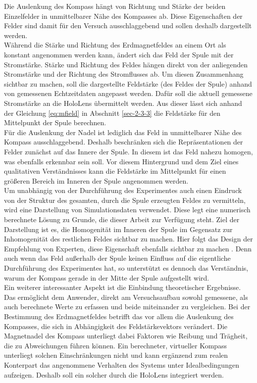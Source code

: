 Die Auslenkung des Kompass hängt von Richtung und Stärke der beiden Einzelfelder in unmittelbarer Nähe des Kompasses ab. Diese Eigenschaften der Felder sind damit für den Versuch ausschlaggebend und sollen deshalb dargestellt werden.\\
\noindent\hspace*{5mm}
Während die Stärke und Richtung des Erdmagnetfeldes an einem Ort als konstant angenommen werden kann, ändert sich das Feld der Spule mit der Stromstärke. Stärke und Richtung des Feldes hängen direkt von der anliegenden Stromstärke und der Richtung des Stromflusses ab. Um diesen Zusammenhang sichtbar zu machen, soll die dargestellte Feldstärke (des Feldes der Spule) anhand von gemessenen Echtzeitdaten angepasst werden. Dafür soll die aktuell gemessene Stromstärke an die HoloLens übermittelt werden. Aus dieser lässt sich anhand der Gleichung \ref{eq:mfield} in Abschnitt \ref{sec-2-3-3} die Feldstärke für den Mittelpunkt der Spule berechnen.\\

Für die Auslenkung der Nadel ist lediglich das Feld in unmittelbarer Nähe des Kompass ausschlaggebend. Deshalb beschränken sich die Repräsentationen der Felder zunächst auf das Innere der Spule. In diesem ist das Feld nahezu homogen, was ebenfalls erkennbar sein soll. Vor diesem Hintergrund und dem Ziel eines qualitativen Verständnisses kann die Feldstärke im Mittelpunkt für einen größeren Bereich im Inneren der Spule angenommen werden.\\

Um unabhängig von der Durchführung des Experimentes auch einen Eindruck von der Struktur des gesamten, durch die Spule erzeugten Feldes zu vermitteln, wird eine Darstellung von Simulationsdaten verwendet. Diese legt eine numerisch berechnete Lösung zu Grunde, die dieser  Arbeit zur Verfügung steht. Ziel der Darstellung ist es, die Homogenität im Inneren der Spule im Gegensatz zur Inhomogenität des restlichen Feldes sichtbar zu machen. Hier folgt das Design der Empfehlung von Experten, diese Eigenschaft ebenfalls sichtbar zu machen \autocite{Reinholz18}. Denn auch wenn das Feld außerhalb der Spule keinen Einfluss auf die eigentliche Durchführung des Experimentes hat, so unterstützt es dennoch das Verständnis, warum der Kompass gerade in der Mitte der Spule aufgestellt wird.\\

Ein weiterer interessanter Aspekt ist die Einbindung theoretischer Ergebnisse. Das ermöglicht dem Anwender, direkt am Versuchsaufbau sowohl gemessene, als auch berechnete Werte zu erfassen und beide miteinander zu vergleichen. Bei der Bestimmung des Erdmagnetfeldes betrifft das vor allem die Auslenkung des Kompasses, die sich in Abhängigkeit des Feldstärkevektors verändert. Die Magnetnadel des Kompass unterliegt dabei Faktoren wie Reibung und Trägheit, die zu Abweichungen führen können. Ein berechneter, virtueller Kompass unterliegt solchen Einschränkungen nicht und kann ergänzend zum realen Konterpart das angenommene Verhalten des Systems unter Idealbedingungen aufzeigen. Deshalb soll ein solcher durch die HoloLens integriert werden.\\

